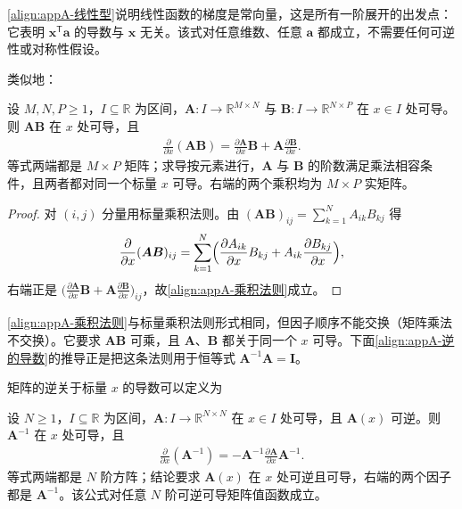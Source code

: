 \documentclass[../main.tex]{subfiles}
\begin{document}
\begin{remark}
\eqref{align:appA-线性型}说明线性函数的梯度是常向量，这是所有一阶展开的出发点：它表明 $\bm{x}^{\mathsf{T}}\bm{a}$ 的导数与 $\bm{x}$ 无关。该式对任意维数、任意 $\bm{a}$ 都成立，不需要任何可逆性或对称性假设。
\end{remark}

类似地：
\begin{proposition}[矩阵乘积的导数]\label{proposition:appA-乘积法则}
设 $M,N,P\geqslant1$，$I\subseteq\mathbb{R}$ 为区间，$\bm{A}:I\to\mathbb{R}^{M\times N}$ 与 $\bm{B}:I\to\mathbb{R}^{N\times P}$ 在 $x\in I$ 处可导。则 $\bm{A}\bm{B}$ 在 $x$ 处可导，且
\begin{align}
  \frac{\partial}{\partial x}(\bm{A}\bm{B})=\frac{\partial\bm{A}}{\partial x}\bm{B}+\bm{A}\frac{\partial\bm{B}}{\partial x}.
  \label{align:appA-乘积法则}
\end{align}
等式两端都是 $M\times P$ 矩阵；求导按元素进行，$\bm{A}$ 与 $\bm{B}$ 的阶数满足乘法相容条件，且两者都对同一个标量 $x$ 可导。右端的两个乘积均为 $M\times P$ 实矩阵。
\end{proposition}

\begin{proof}
对 $(i,j)$ 分量用标量乘积法则。由 $(\bm{A}\bm{B})_{ij}=\sum_{k=1}^{N}A_{ik}B_{kj}$ 得
\begin{align*}
 \frac{\partial}{\partial x}(\bm{A}\bm{B})_{ij}=\sum_{k=1}^{N}\Bigl(\frac{\partial A_{ik}}{\partial x}B_{kj}+A_{ik}\frac{\partial B_{kj}}{\partial x}\Bigr),
\end{align*}
右端正是 $\bigl(\frac{\partial\bm{A}}{\partial x}\bm{B}+\bm{A}\frac{\partial\bm{B}}{\partial x}\bigr)_{ij}$，故\eqref{align:appA-乘积法则}成立。
\end{proof}

\begin{remark}
\eqref{align:appA-乘积法则}与标量乘积法则形式相同，但因子顺序不能交换（矩阵乘法不交换）。它要求 $\bm{A}\bm{B}$ 可乘，且 $\bm{A}$、$\bm{B}$ 都关于同一个 $x$ 可导。下面\eqref{align:appA-逆的导数}的推导正是把这条法则用于恒等式 $\bm{A}^{-1}\bm{A}=\bm{I}$。
\end{remark}

矩阵的逆关于标量 $x$ 的导数可以定义为
\begin{proposition}[逆矩阵的导数]\label{proposition:appA-逆矩阵的导数}
设 $N\geqslant1$，$I\subseteq\mathbb{R}$ 为区间，$\bm{A}:I\to\mathbb{R}^{N\times N}$ 在 $x\in I$ 处可导，且 $\bm{A}(x)$ 可逆。则 $\bm{A}^{-1}$ 在 $x$ 处可导，且
\begin{align}
  \frac{\partial}{\partial x}(\bm{A}^{-1})=-\bm{A}^{-1}\frac{\partial\bm{A}}{\partial x}\bm{A}^{-1}.
  \label{align:appA-逆的导数}
\end{align}
等式两端都是 $N$ 阶方阵；结论要求 $\bm{A}(x)$ 在 $x$ 处可逆且可导，右端的两个因子都是 $\bm{A}^{-1}$。该公式对任意 $N$ 阶可逆可导矩阵值函数成立。
\end{proposition}
\end{document}
